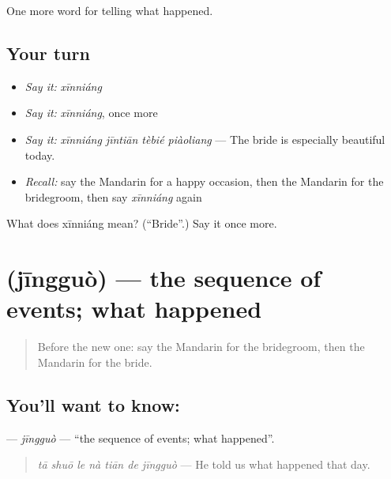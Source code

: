 \begin{grammarlens}[title={What you've built}]
One more word for telling what happened.
\end{grammarlens}

\subsection*{Your turn}
\begin{itemize}
\raggedright
  \item \emph{Say it:} \emph{xīnniáng}
  \item \emph{Say it:} \emph{xīnniáng}, once more
  \item \emph{Say it:} \emph{xīnniáng jīntiān tèbié piàoliang} — The bride is especially beautiful today.
  \item \emph{Recall:} say the Mandarin for a happy occasion, then the Mandarin for the bridegroom, then say \emph{xīnniáng} again
\end{itemize}

\begin{tcolorbox}[breakable,colback=teal!4,colframe=teal!35!black,title={Before you move on}]
What does xīnniáng mean? (\textquotedblleft{}Bride\textquotedblright{}.) Say it once more.
\end{tcolorbox}
\section[\texorpdfstring{\zh{经过} (jīngguò)}{经过 (jīngguò)}]{ (jīngguò) — the sequence of events; what happened}

\label{lesson:ZH-C306-jingguo}



\begin{quote}
Before the new one: say the Mandarin for the bridegroom, then the Mandarin for the bride.
\end{quote}

\subsection*{You'll want to know: }
\textbf{} — \emph{jīngguò} — \textquotedblleft{}the sequence of events; what happened\textquotedblright{}.

\begin{quote}
\textbf{} \emph{tā shuō le nà tiān de jīngguò} — He told us what happened that day.
\end{quote}

